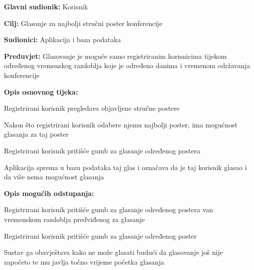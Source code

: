 				
				\noindent {}
				\begin{packed_item}
					
					\item \textbf{Glavni sudionik: }Korisnik
					\item  \textbf{Cilj:} Glasanje za najbolji stručni poster konferencije
					\item  \textbf{Sudionici:} Aplikacija i baza podataka
					\item  \textbf{Preduvjet:} Glasovanje je moguće samo registriranim korisnicima tijekom određenog vremenskog razdoblja koje je određeno danima i vremenom održavanja konferencije
					\item  \textbf{Opis osnovnog tijeka:}
					
					\item[] \begin{packed_enum}
						
						\item Registrirani korisnik pregledava objavljene stručne postere
						\item Nakon što registrirani korisnik odabere njemu najbolji poster, ima mogućnost glasanja za taj poster
						\item Registrirani korisnik pritišće gumb za glasanje određenog postera
						\item Aplikacija sprema u bazu podataka taj glas i označava da je taj korisnik glasao i da više nema mogućnost glasanja

					\end{packed_enum}
					
					\item  \textbf{Opis mogućih odstupanja:}
					
					\item[] \begin{packed_item}
						
						\item[3.a] Registrirani korisnik pritišće gumb za glasanje određenog postera van vremenskom razdoblja predviđenog za glasanje
						\item[] \begin{packed_enum}
							
							\item Registrirani korisnik pritišće gumb za glasanje određenog poster
							\item Sustav ga obavještava kako ne može glasati budući da glasovanje još nije započeto te mu javlja točno vrijeme početka glasanja
							

\end{packed_enum}
\end{packed_item}
\end{packed_item}
